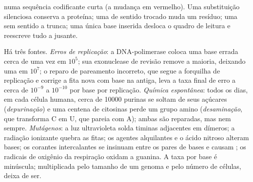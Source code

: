 \begin{omfigure}

{\small {} numa sequência codificante curta (a mudança
em vermelho). Uma substituição silenciosa conserva a proteína; uma de
sentido trocado muda um resíduo; uma sem sentido a trunca; uma única
base inserida desloca o quadro de leitura e reescreve tudo a jusante.}
\end{omfigure}

\begin{proposition}\label{prop:b2:genome-diversification:sources}
Há três fontes. \emph{Erros de replicação}: a DNA-polimerase coloca
uma base errada cerca de uma vez em $10^{5}$; sua exonuclease de
revisão remove a maioria, deixando uma em $10^{7}$; o reparo de
pareamento incorreto, que segue a forquilha de replicação e corrige a
fita nova com base na antiga, leva a taxa final de erro a cerca de
$10^{-9}$ a $10^{-10}$ por base por replicação. \emph{Química
espontânea}: todos os dias, em cada célula humana, cerca de
\num{10000} purinas se soltam de seus açúcares
(\emph{depurinação}) e uma centena de citosinas perde um grupo amino
(\emph{desaminação}, que transforma C em U, que pareia com A); ambas
são reparadas, mas nem sempre. \emph{Mutágenos}: a luz ultravioleta
solda timinas adjacentes em dímeros; a radiação ionizante quebra as
fitas; os agentes alquilantes e o ácido nitroso alteram bases; os
corantes intercalantes se insinuam entre os pares de bases e causam
; os radicais de oxigênio da
respiração oxidam a guanina. A taxa por base é minúscula; multiplicada
pelo tamanho de um genoma e pelo número de células, deixa de ser.
\end{proposition}

